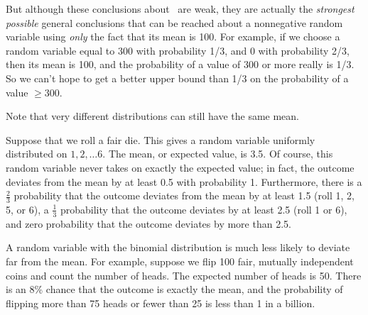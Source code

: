But although these conclusions about \IQ\ are weak, they are actually the
\emph{strongest possible} general conclusions that can be reached about a
nonnegative random variable using \emph{only} the fact that its mean is
100.  For example, if we choose a random variable equal to 300 with
probability 1/3, and 0 with probability 2/3, then its mean is 100, and the
probability of a value of 300 or more really is 1/3.  So we can't hope to
get a better upper bound than 1/3 on the probability of a value
$\geq 300$.

\iffalse
Note that very different distributions can still have the same mean.

\begin{example}
  Suppose that we roll a fair die.  This gives a random variable
  uniformly distributed on $1, 2, \dots 6$.  The mean, or expected
  value, is 3.5.  Of course, this random variable never takes on
  exactly the expected value; in fact, the outcome deviates from the
  mean by at least 0.5 with probability 1.  Furthermore, there is a
  $\frac{2}{3}$ probability that the outcome deviates from the mean by
  at least 1.5 (roll 1, 2, 5, or 6), a $\frac{1}{3}$ probability that
  the outcome deviates by at least 2.5 (roll 1 or 6), and zero
  probability that the outcome deviates by more than 2.5.
\end{example}

\begin{example}
  A random variable with the binomial distribution is much less likely
  to deviate far from the mean.  For example, suppose we flip 100
  fair, mutually independent coins and count the number of heads.  The
  expected number of heads is 50.  There is an 8\% chance that the
  outcome is exactly the mean, and the probability of flipping more
  than 75 heads or fewer than 25 is less than 1 in a billion.
\end{example}

